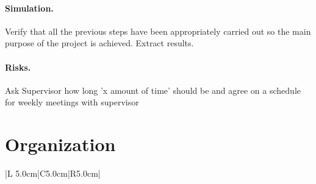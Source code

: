 \documentclass{article}
\begin{document}
		\paragraph{Simulation.} Verify that all the previous steps have been appropriately carried out so the main purpose of the project is achieved. Extract results.
		
		\paragraph{Risks.} Ask Supervisor how long 'x amount of time' should be and agree on a schedule for weekly meetings with supervisor
	\section{Organization}	
	\begin{tabular}{|L {5.0cm}|C{5.0cm}|R{5.0cm}|}
	
	\end{tabular}
		
\end{document}
